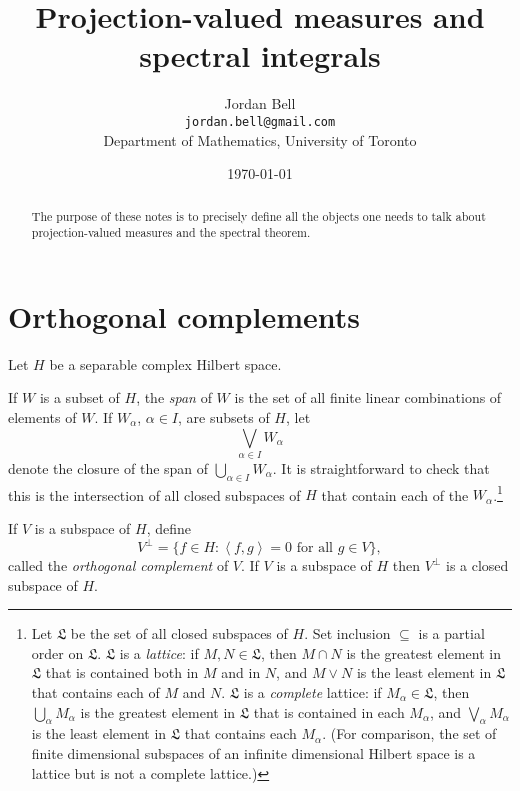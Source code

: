 \documentclass{article}
\newcommand{\inner}[2]{\left\langle #1, #2 \right\rangle}
\begin{document}
\title{Projection-valued measures and spectral integrals}
\author{Jordan Bell\\ \texttt{jordan.bell@gmail.com}\\Department of Mathematics, University of Toronto}
\date{\today}
\maketitle
\begin{abstract}
The purpose of these notes is to precisely define all the objects one needs to talk about projection-valued measures and the spectral theorem. 
\end{abstract}



\section{Orthogonal complements}
Let $H$ be a separable complex Hilbert space. 

If $W$ is a subset of $H$, the {\em span} of $W$ is the set of all finite linear combinations of elements of $W$. 
If $W_\alpha$, $\alpha \in I$, are subsets of $H$, let 
\[
\bigvee_{\alpha \in I} W_\alpha
\]
denote the closure of the span of $\bigcup_{\alpha \in I} W_\alpha$. It is straightforward to check that this is the intersection of all closed subspaces of $H$ that contain each of the $W_\alpha$.\footnote{Let $\mathfrak{L}$ be the set of all closed subspaces of $H$. Set inclusion $\subseteq$ is a partial order on $\mathfrak{L}$. $\mathfrak{L}$ is 
a {\em lattice}: if $M,N \in \mathfrak{L}$, then $M \cap N$ is the greatest element in $\mathfrak{L}$ that is contained both in $M$ and in $N$, and
$M \vee N$ is the least element in $\mathfrak{L}$ that contains each of $M$ and $N$. $\mathfrak{L}$ is a {\em complete} lattice: if $M_\alpha \in \mathfrak{L}$,
then $\bigcup_\alpha M_\alpha$ is the greatest element in $\mathfrak{L}$ that is contained in each $M_\alpha$, and 
$\bigvee_\alpha M_\alpha$ is the least element in $\mathfrak{L}$ that contains each $M_\alpha$. (For comparison, the set of finite dimensional subspaces of an infinite
dimensional Hilbert space is a lattice but is not a complete lattice.)}

If $V$ is a subspace of $H$, define
\[
V^\perp=\{f \in H: \textrm{$\inner{f}{g}=0$ for all $g \in V$}\},
\]
called the {\em orthogonal complement} of $V$.
If $V$ is a subspace of $H$ then $V^\perp$ is a closed subspace of $H$.
\end{document}
